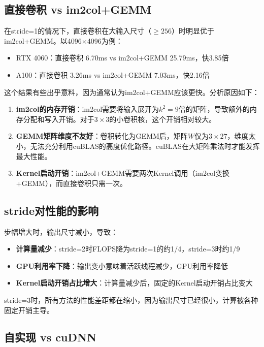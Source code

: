 \documentclass[a4paper]{article}
\begin{document}
\subsection{直接卷积 vs im2col+GEMM}

在stride=1的情况下，直接卷积在大输入尺寸（$\geq 256$）时明显优于im2col+GEMM。以4096$\times$4096为例：
\begin{itemize}
    \item RTX 4060：直接卷积 6.70ms vs im2col+GEMM 25.79ms，快3.85倍
    \item A100：直接卷积 3.26ms vs im2col+GEMM 7.03ms，快2.16倍
\end{itemize}

这个结果有些出乎意料，因为通常认为im2col+GEMM应该更快。分析原因如下：

\begin{enumerate}
    \item \textbf{im2col的内存开销}：im2col需要将输入展开为$k^2 = 9$倍的矩阵，导致额外的内存分配和写入开销。对于$3\times 3$的小卷积核，这个开销相对较大。
    \item \textbf{GEMM矩阵维度不友好}：卷积转化为GEMM后，矩阵$W$仅为$3\times 27$，维度太小，无法充分利用cuBLAS的高度优化路径。cuBLAS在大矩阵乘法时才能发挥最大性能。
    \item \textbf{Kernel启动开销}：im2col+GEMM需要两次Kernel调用（im2col变换+GEMM），而直接卷积只需一次。
\end{enumerate}

\subsection{stride对性能的影响}

步幅增大时，输出尺寸减小，导致：
\begin{itemize}
    \item \textbf{计算量减少}：stride=2时FLOPS降为stride=1的约1/4，stride=3时约1/9
    \item \textbf{GPU利用率下降}：输出变小意味着活跃线程减少，GPU利用率降低
    \item \textbf{Kernel启动开销占比增大}：计算量减少后，固定的Kernel启动开销占比变大
\end{itemize}

stride=3时，所有方法的性能差距都在缩小，因为输出尺寸已经很小，计算被各种固定开销主导。

\subsection{自实现 vs cuDNN}
\end{document}
